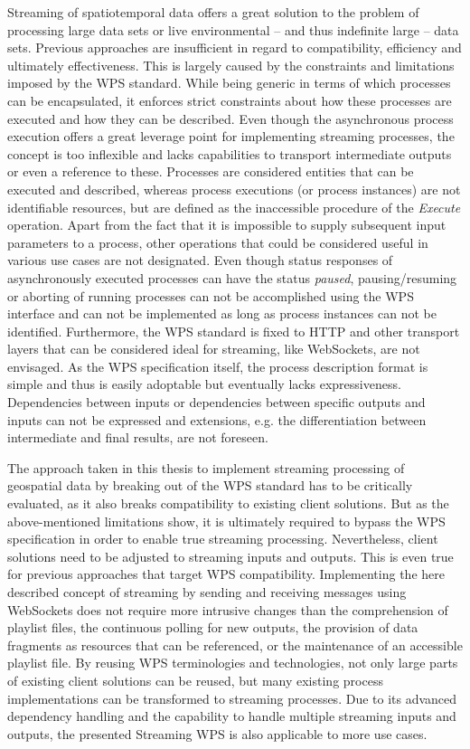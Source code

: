 Streaming of spatiotemporal data offers a great solution to the problem of processing large data sets or live environmental -- and thus indefinite large -- data sets. Previous approaches are insufficient in regard to compatibility, efficiency and ultimately effectiveness. This is largely caused by the constraints and limitations imposed by the WPS standard. While being generic in terms of which processes can be encapsulated, it enforces strict constraints about how these processes are executed and how they can be described. Even though the asynchronous process execution offers a great leverage point for implementing streaming processes, the concept is too inflexible and lacks capabilities to transport intermediate outputs or even a reference to these. Processes are considered entities that can be executed and described, whereas process executions (or process instances) are not identifiable resources, but are defined as the inaccessible procedure of the \emph{Execute} operation. Apart from the fact that it is impossible to supply subsequent input parameters to a process, other operations that could be considered useful in various use cases are not designated. Even though status responses of asynchronously executed processes can have the status \emph{paused}, pausing/resuming or aborting of running processes can not be accomplished using the WPS interface and can not be implemented as long as process instances can not be identified. Furthermore, the WPS standard is fixed to HTTP and other transport layers that can be considered ideal for streaming, like WebSockets, are not envisaged. As the WPS specification itself, the process description format is simple and thus is easily adoptable but eventually lacks expressiveness. Dependencies between inputs or dependencies between specific outputs and inputs can not be expressed and extensions, e.g. the differentiation between intermediate and final results, are not foreseen.

The approach taken in this thesis to implement streaming processing of geospatial data by breaking out of the WPS standard has to be critically evaluated, as it also breaks compatibility to existing client solutions. But as the above-mentioned limitations show, it is ultimately required to bypass the WPS specification in order to enable true streaming processing. Nevertheless, client solutions need to be adjusted to streaming inputs and outputs. This is even true for previous approaches that target WPS compatibility. Implementing the here described concept of streaming by sending and receiving messages using WebSockets does not require more intrusive changes than the comprehension of playlist files, the continuous polling for new outputs, the provision of data fragments as resources that can be referenced, or the maintenance of an accessible playlist file. By reusing WPS terminologies and technologies, not only large parts of existing client solutions can be reused, but many existing process implementations can be transformed to streaming processes. Due to its advanced dependency handling and the capability to handle multiple streaming inputs and outputs, the presented Streaming WPS is also applicable to more use cases.

